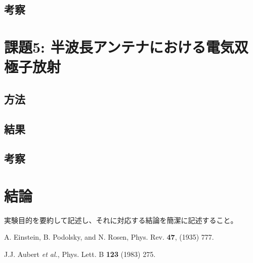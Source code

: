 \documentclass[uplatex,dvipdfmx,a4j,12pt]{jsarticle}
\begin{document}
\subsection{考察}


\section{課題5: 半波長アンテナにおける電気双極子放射}
\subsection{方法}

\subsection{結果}

\subsection{考察}


\section{結論}
実験目的を要約して記述し、それに対応する結論を簡潔に記述すること。


\begin{thebibliography}{9}

        A. Einstein, B. Podolsky, and N. Rosen, 
        Phys. Rev. \textbf{47}, (1935) 777.

        J.J. Aubert \textit{et al.},
        Phys. Lett. B \textbf{123} (1983) 275.
    
\end{thebibliography}
\end{document}
